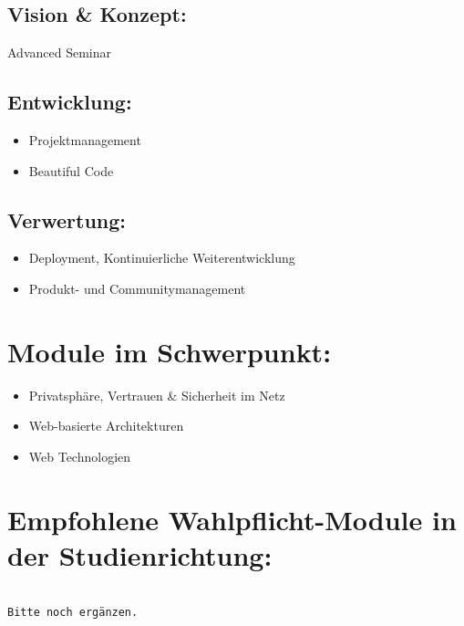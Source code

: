 \subsection*{Vision \& Konzept:}\label{vision-konzept-3}

Advanced Seminar

\subsection*{Entwicklung:}\label{entwicklung-3}

\begin{itemize}
\item
  Projektmanagement
\item
  Beautiful Code
\end{itemize}

\subsection*{Verwertung:}\label{verwertung-3}

\begin{itemize}
\item
  Deployment, Kontinuierliche Weiterentwicklung
\item
  Produkt- und Communitymanagement
\end{itemize}

\section*{Module im Schwerpunkt:}\label{module-im-schwerpunkt}

\begin{itemize}
\item
  Privatsphäre, Vertrauen \& Sicherheit im Netz
\item
  Web-basierte Architekturen
\item
  Web Technologien
\end{itemize}

\section*{Empfohlene Wahlpflicht-Module in der
Studienrichtung:}\label{empfohlene-wahlpflicht-module-in-der-studienrichtung-1}

\begin{verbatim}

Bitte noch ergänzen.
\end{verbatim}

